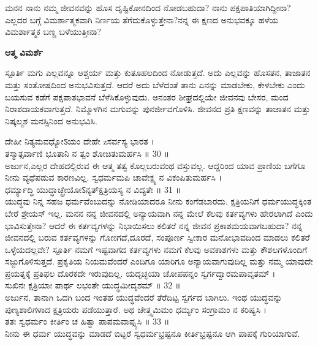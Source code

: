 \begin{mananam}{\kanfont ಮನನ}
\footnotesize \mananamfont ನಾನು ನಮ್ಮ ಜೀವನವನ್ನು ಹೊಸ ದೃಷ್ಟಿಕೋನದಿಂದ ನೋಡಬಹುದಾ? ನಾನು ಪಕ್ಷಪಾತಿಯಾಗಿದ್ದೀನಾ? ಎಲ್ಲದರ ಬಗ್ಗೆ ವಿಮರ್ಶಾತ್ಮಕವಾಗಿ ನಿರ್ಣಯ ತೆಗೆದುಕೊಳ್ಳುತ್ತೇನಾ?ನನ್ನ ಈ ಕ್ಷಣದ ಅನುಭವಕ್ಕೂ ಹಳೆಯ  ವಿಮರ್ಶಾತ್ಮಕ ಬಣ್ಣ ಬಳೆಯುತ್ತೀನಾ?
\end{mananam}
\WritingHand\enspace\textbf{ಆತ್ಮ ವಿಮರ್ಶೆ}
\begin{inspiration}{\kanfont ಸ್ಪೂರ್ತಿ}
\footnotesize \mananamfont ಮಗು ಎಲ್ಲವನ್ನೂ ಆಶ್ಚರ್ಯ ಮತ್ತು ಕುತೂಹಲದಿಂದ ನೋಡುತ್ತದೆ. ಅದು ಎಲ್ಲವನ್ನು ಹೊಸತನ, ತಾಜಾತನ ಮತ್ತು ಸಂತೋಷದಿಂದ ಅನುಭವಿಸುತ್ತದೆ. ಆದರೆ ಅದು ಬೆಳೆದಂತೆ ತಾನು ಏನನ್ನು ಮಾಡಬೇಕು, ಕೇಳಬೇಕು ಎಂದು ಬಯಸುವ ಕಡೆಗೆ ಪಕ್ಷಪಾತಭಾವನೆ ಬೆಳೆಸಿಕೊಳ್ಳುವುದು. ಅನಂತರ ಶೀಘ್ರದಲ್ಲಿಯೇ ಜೀವನವು ಬೇಸರ, ಮಂದ ನಿರಾಶದಾಯಕವಾಗುತ್ತದೆ. ನಿಮ್ಮೊಳಗಿನ ಮಗುವನ್ನು ಪುನರ್ಜೀವಗೊಳಿಸಿ. ಜೀವನದ ಪ್ರತಿ ಕ್ಷಣವನ್ನು ತಾಜಾತನ ಮತ್ತು ನಿಷ್ಕಲ್ಮಶ ಮನಸ್ಸಿನಿಂದ ಅನುಭವಿಸಿ.
\end{inspiration}
ದೇಹೀ ನಿತ್ಯಮವಧ್ಯೋऽಯಂ ದೇಹೇ zಸರ್ವಸ್ಯ ಭಾರತ ।\\
ತಸ್ಮಾತ್ಸರ್ವಾಣಿ ಭೂತಾನಿ ನ ತ್ವಂ ಶೋಚಿತುಮರ್ಹಸಿ ॥ 30 ॥\\
 ಅರ್ಜುನ,ಎಲ್ಲರ ದೇಹದಲ್ಲಿರುವ ಈ ಆತ್ಮ ತತ್ವ ಕೊಲ್ಲಬರುವಂಥ ವಸ್ತುವಲ್ಲ. ಆದ್ದರಿಂದ ಯಾವ ಪ್ರಾಣಿಯ ಬಗೆಗೂ ನೀನು ವ್ಯಥೆಪಡುವ ಕಾರಣವಿಲ್ಲ.
ಸ್ವಧರ್ಮಮಪಿ ಚಾವೇಕ್ಷ್ಯ ನ ವಿಕಂಪಿತುಮರ್ಹಸಿ ।\\
ಧರ್ಮ್ಯಾದ್ಧಿ ಯುದ್ಧಾಚ್ಛ್ರೇಯೋऽನ್ಯತ್ಕ್ಷತ್ರಿಯಸ್ಯ ನ ವಿದ್ಯತೇ ॥ 31 ॥\\
 ಯುದ್ಧವು ನಿನ್ನ ಸಹಜ ಧರ್ಮವೆಂಬುದನ್ನು ನೋಡಿಯಾದರೂ ನೀನು ಕಂಗೆಡಬಾರದು. ಕ್ಷತ್ರಿಯನಿಗೆ ಧರ್ಮಯುದ್ಧಕ್ಕಿಂತ ಬೇರೆ ಶ್ರೇಯಸ್ ಇಲ್ಲ.
ಮನನ 
 ನನ್ನ ಜೀವನದಲ್ಲಿ ಅನ್ಯಾಯವಾಗಿ ನನ್ನ ಮೇಲೆ ಕೆಲವು ಕರ್ತವ್ಯಗಳು ಹೇರಲಾಗಿದೆ ಎಂದು ಭಾವಿಸುತ್ತೇನಾ? ಆದರೆ ಈ ಕರ್ತವ್ಯಗಳನ್ನು ನಿಭಾಯಿಸಲು ಕಲಿತರೆ ನನ್ನ ಜೀವನ ಪ್ರಕಾಶಮಯವಾಗಬಹುದಾ? ನನ್ನ ಜೀವನದಲ್ಲಿ ಬರುವ ಕರ್ತವ್ಯಗಳನ್ನು ಗೊಣಗದೆ,ದೂರದೆ, ಸಂಪೂರ್ಣ ಸ್ವೀಕಾರ ಮನೋಭಾವದಿಂದ ಮಾಡಲು ಕಲಿತರೆ ಒಳ್ಳೆಯದಲ್ಲವೇ?
 ಸ್ಪೂರ್ತಿ 
 ನಮಗೆ ಇಷ್ಟವಾಗದ ಕರ್ತವ್ಯಗಳು ನಮಗೆ ಕೆಲವು ಅವಕಾಶಗಳು ಮತ್ತು ಕೌಶಲಗಳೊಂದಿಗೆ ಸಜ್ಜುಗೊಳಿಸುತ್ತದೆ. ಪ್ರಕೃತಿಯ ನಿಯಮವೆಂದರೆ ಎಂದಿಗೂ ಯಾರಿಗೂ ಅನ್ಯಾಯವಾಗುವುದಿಲ್ಲ ಮತ್ತು ನಮ್ಮ ಯಾವುದೇ ಪ್ರಯತ್ನಕ್ಕೆ ಪ್ರತಿಫಲ ದೊರಕದೇ ಇರುವುದಿಲ್ಲ.
ಯದೃಚ್ಛಯಾ ಚೋಪಪನ್ನಂ ಸ್ವರ್ಗದ್ವಾರಮಪಾವೃತಮ್ ।\\
ಸುಖಿನಃ ಕ್ಷತ್ರಿಯಾಃ ಪಾರ್ಥ ಲಭಂತೇ ಯುದ್ಧಮೀದೃಶಮ್ ॥ 32 ॥\\
 ಅರ್ಜುನ, ತಾನಾಗಿ ಒದಗಿ ಬಂದ ಇಂತಹ ಯುದ್ಧವೆಂದರೆ ತೆರೆದಿಟ್ಟ ಸ್ವರ್ಗದ ಬಾಗಿಲು. ಇಂಥ ಯುದ್ಧವನ್ನು ಪುಣ್ಯಶಾಲಿಗಳಾದ ಕ್ಷತ್ರಿಯರು ಪಡೆಯುತ್ತಾರೆ.
ಅಥ ಚೇತ್ತ್ವಮಿಮಂ ಧರ್ಮ್ಯಂ ಸಂಗ್ರಾಮಂ ನ ಕರಿಷ್ಯಸಿ ।\\
ತತಃ ಸ್ವಧರ್ಮಂ ಕೀರ್ತಿಂ ಚ ಹಿತ್ವಾ ಪಾಪಮವಾಪ್ಸ್ಯಸಿ ॥ 33 ॥\\
 ನೀನು ಈ ಧರ್ಮ ಯುದ್ಧವನ್ನು ಮಾಡದೆ ಬಿಟ್ಟರೆ ಸ್ವಧರ್ಮಭ್ರಷ್ಟನೂ ಕೀರ್ತಿಭ್ರಷ್ಟನೂ ಆಗಿ ಪಾಪಕ್ಕೆ ಗುರಿಯಾಗುವೆ.

